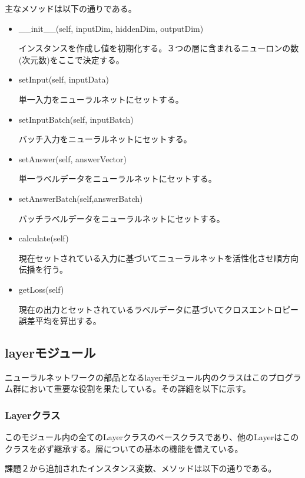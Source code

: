 \documentclass{ujarticle} %
\begin{document}
主なメソッドは以下の通りである。
\begin{itemize}
  \item \_\_init\_\_(self, inputDim, hiddenDim, outputDim)

  インスタンスを作成し値を初期化する。３つの層に含まれるニューロンの数(次元数)をここで決定する。

  \item setInput(self, inputData)

  単一入力をニューラルネットにセットする。

  \item setInputBatch(self, inputBatch)

  バッチ入力をニューラルネットにセットする。

  \item setAnswer(self, answerVector)

  単一ラベルデータをニューラルネットにセットする。

  \item setAnswerBatch(self,answerBatch)

  バッチラベルデータをニューラルネットにセットする。

  \item calculate(self)

  現在セットされている入力に基づいてニューラルネットを活性化させ順方向伝播を行う。

  \item getLoss(self)

  現在の出力とセットされているラベルデータに基づいてクロスエントロピー誤差平均を算出する。

\end{itemize}

\subsection{layerモジュール}
ニューラルネットワークの部品となるlayerモジュール内のクラスはこのプログラム群において重要な役割を果たしている。その詳細を以下に示す。

\subsubsection{Layerクラス}
このモジュール内の全てのLayerクラスのベースクラスであり、他のLayerはこのクラスを必ず継承する。層についての基本の機能を備えている。

課題２から追加されたインスタンス変数、メソッドは以下の通りである。
\end{document}
